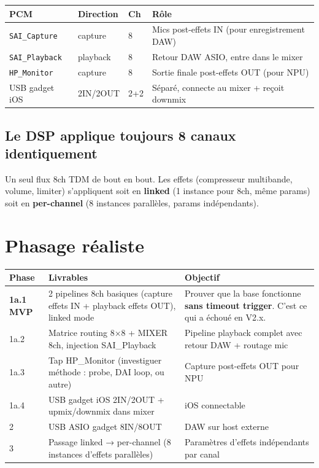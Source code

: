 \documentclass[11pt,a4paper]{article}
\begin{document}
\begin{center}
\begin{tabularx}{\textwidth}{lllX}
\toprule
\textbf{PCM} & \textbf{Direction} & \textbf{Ch} & \textbf{Rôle} \\
\midrule
\texttt{SAI\_Capture} & capture & 8 & Mics post-effets IN (pour enregistrement DAW) \\
\texttt{SAI\_Playback} & playback & 8 & Retour DAW ASIO, entre dans le mixer \\
\texttt{HP\_Monitor} & capture & 8 & Sortie finale post-effets OUT (pour NPU) \\
USB gadget iOS & 2IN/2OUT & 2+2 & Séparé, connecte au mixer + reçoit downmix \\
\bottomrule
\end{tabularx}
\end{center}

\subsection{Le DSP applique toujours 8 canaux identiquement}

Un seul flux 8ch TDM de bout en bout. Les effets (compresseur multibande, volume, limiter) s'appliquent soit en \textbf{linked} (1 instance pour 8ch, même params) soit en \textbf{per-channel} (8 instances parallèles, params indépendants).

\section{Phasage réaliste}

\begin{center}
\begin{tabularx}{\textwidth}{llX}
\toprule
\textbf{Phase} & \textbf{Livrables} & \textbf{Objectif} \\
\midrule
\textbf{1a.1 MVP} & 2 pipelines 8ch basiques (capture effets IN + playback effets OUT), linked mode & Prouver que la base fonctionne \textbf{sans timeout trigger}. C'est ce qui a échoué en V2.x. \\
1a.2 & Matrice routing 8×8 + MIXER 8ch, injection SAI\_Playback & Pipeline playback complet avec retour DAW + routage mic \\
1a.3 & Tap HP\_Monitor (investiguer méthode : probe, DAI loop, ou autre) & Capture post-effets OUT pour NPU \\
1a.4 & USB gadget iOS 2IN/2OUT + upmix/downmix dans mixer & iOS connectable \\
2 & USB ASIO gadget 8IN/8OUT & DAW sur host externe \\
3 & Passage linked → per-channel (8 instances d'effets parallèles) & Paramètres d'effets indépendants par canal \\
\bottomrule
\end{tabularx}
\end{center}
\end{document}
